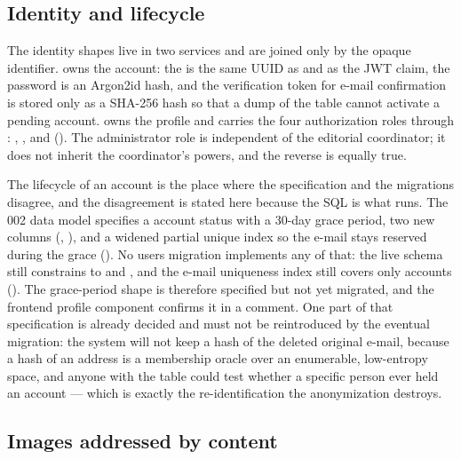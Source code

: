 \subsection{Identity and lifecycle}

The identity shapes live in two services and are joined only by the opaque
identifier.  owns the account: the  is the
same UUID as  and as the JWT  claim, the
password is an Argon2id hash, and the verification token for e-mail confirmation
is stored only as a SHA-256 hash so that a dump of the table cannot activate a
pending account.  owns the profile and carries the four
authorization roles through : ,
,  and 
().
The administrator role is independent of the editorial coordinator; it does not
inherit the coordinator's powers, and the reverse is equally true.

The lifecycle of an account is the place where the specification and the
migrations disagree, and the disagreement is stated here because the SQL is what
runs. The 002 data model specifies a  account status with
a 30-day grace period, two new columns (,
), and a widened partial unique index
 so the e-mail stays reserved during the
grace ().
No users migration implements any of that: the live schema still constrains
 to  and , and the e-mail
uniqueness index still covers only  accounts
().
The grace-period shape is therefore specified but not yet migrated, and the
frontend profile component confirms it in a comment. One part of that
specification is already decided and must not be reintroduced by the eventual
migration: the system will not keep a hash of the deleted original e-mail,
because a hash of an address is a membership oracle over an enumerable,
low-entropy space, and anyone with the table could test whether a specific
person ever held an account --- which is exactly the re-identification the
anonymization destroys.

\subsection{Images addressed by content}

